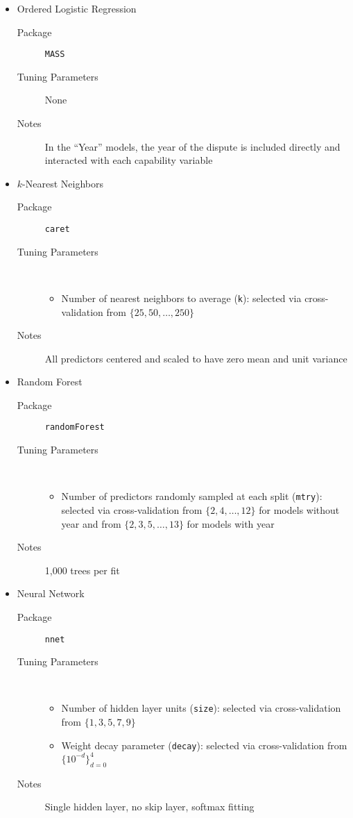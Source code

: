 \begin{itemize}
  \item Ordered Logistic Regression
  \begin{description}
    \item[Package] \texttt{MASS} \citep{pkg-MASS}
    \item[Tuning Parameters] None
    \item[Notes] In the ``Year'' models, the year of the dispute is included directly and interacted with each capability variable
  \end{description}

  \item $k$-Nearest Neighbors
  \begin{description}
    \item[Package] \texttt{caret} \citep{pkg-caret}
    \item[Tuning Parameters] ~
    \begin{itemize}
      \item Number of nearest neighbors to average (\texttt{k}): selected via cross-validation from $\{25, 50, \ldots, 250\}$
    \end{itemize}
    \item[Notes] All predictors centered and scaled to have zero mean and unit variance
  \end{description}

  \item Random Forest
  \begin{description}
    \item[Package] \texttt{randomForest} \citep{pkg-randomForest}
    \item[Tuning Parameters] ~
    \begin{itemize}
      \item Number of predictors randomly sampled at each split (\texttt{mtry}): selected via cross-validation from $\{2, 4, \ldots, 12\}$ for models without year and from $\{2, 3, 5, \ldots, 13\}$ for models with year
    \end{itemize}
    \item[Notes] 1,000 trees per fit
  \end{description}

  \item Neural Network
  \begin{description}
    \item[Package] \texttt{nnet} \citep{pkg-MASS}
    \item[Tuning Parameters] ~
    \begin{itemize}
      \item Number of hidden layer units (\texttt{size}): selected via cross-validation from $\{1, 3, 5, 7, 9\}$
      \item Weight decay parameter (\texttt{decay}): selected via cross-validation from $\{10^{-d}\}_{d=0}^4$
    \end{itemize}
    \item[Notes] Single hidden layer, no skip layer, softmax fitting
  \end{description}


\end{itemize}
